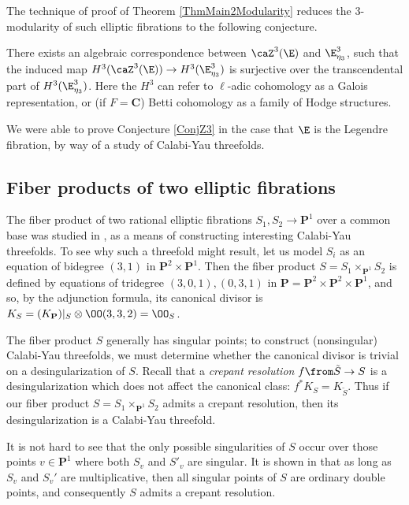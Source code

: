 \documentclass{article}
\def\P{\mathbf{P}}
\begin{document}
The technique of proof of Theorem \ref{ThmMain2Modularity} reduces the 3-modularity of such elliptic fibrations to the following conjecture.

\begin{conj} \label{ConjZ3}
There exists an algebraic correspondence between $\caZ^3(\E)$ and $\E^3_{\eta_3}$, such that the induced map $H^3(\caZ^3(\E))\to H^3(\E^3_{\eta_3})$ is surjective over the transcendental part of $H^3(\E^3_{\eta_3})$.   Here the $H^3$ can refer to $\ell$-adic cohomology as a Galois representation, or (if $F=\mathbf{C}$) Betti cohomology as a family of Hodge structures.
\end{conj}


We were able to prove Conjecture \ref{ConjZ3} in the case that $\E$ is the Legendre fibration, by way of a study of Calabi-Yau threefolds.

\subsection{Fiber products of two elliptic fibrations} 

The fiber product of two rational elliptic fibrations $S_1,S_2\to\P^1$ over a common base was studied in \cite{Schoen}, as a means of constructing interesting Calabi-Yau threefolds.  To see why such a threefold might result, let us model $S_i$ as an equation of bidegree $(3,1)$ in $\P^2\times \P^1$.  Then the fiber product $S=S_1\times_{\P^1} S_2$ is defined by equations of tridegree $(3,0,1),(0,3,1)$ in $\P=\P^2\times\P^2\times\P^1$, and so, by the adjunction formula, its canonical divisor is $K_S=(K_{\P})\vert_S \otimes \OO(3,3,2)=\OO_S$. 

The fiber product $S$ generally has singular points; to construct (nonsingular) Calabi-Yau threefolds, we must determine whether the canonical divisor is trivial on a desingularization of $S$.  Recall that a {\em crepant resolution} $f\from \tilde{S}\to S$ is a desingularization which does not affect the canonical class:  $f^*K_S=K_{\tilde{S}}$.  Thus if our fiber product $S=S_1\times_{\P^1} S_2$ admits a crepant resolution, then its desingularization is a Calabi-Yau threefold.

It is not hard to see that the only possible singularities of $S$ occur over those points $v\in \P^1$ where both $S_v$ and $S'_v$ are singular.  It is shown in \cite{Schoen} that as long as $S_v$ and $S_v'$ are multiplicative, then all singular points of $S$ are ordinary double points, and consequently $S$ admits a crepant resolution.  
\end{document}
